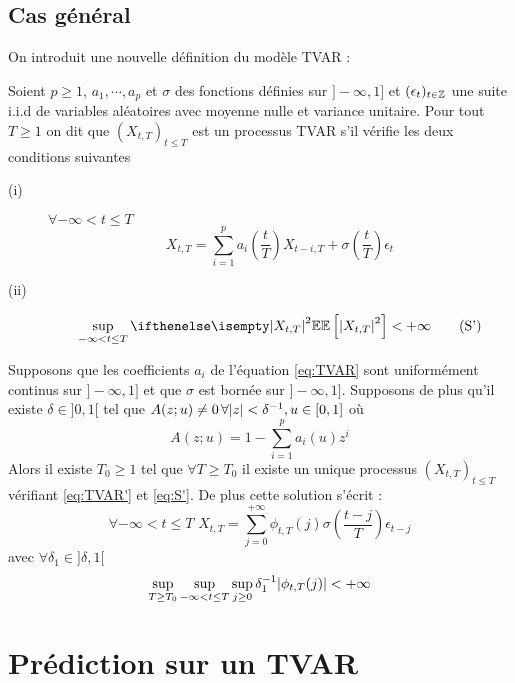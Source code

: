 \documentclass[a4paper,french]{article}
\begin{document}
\subsection{Cas général}
On introduit une nouvelle définition du modèle TVAR :
\begin{Def} \label{def:TVAR}
Soient $p\geq 1$, $a_1,\cdots, a_p$ et $\sigma$ des fonctions définies sur $]-\infty,1]$ et $(\epsilon_t)_{t\in \mathbb{Z}}$ une suite i.i.d de variables aléatoires avec moyenne nulle et variance unitaire. Pour tout $T \geq 1$ on dit que $(X_{t,T})_{t\leq T}$ est un processus TVAR s'il vérifie les deux conditions suivantes 
\begin{description}
\item[(i)] $\forall -\infty < t \leq T $
\begin{equation}\label{eq:TVAR'}
X_{t,T} = \sum_{i=1}^p a_i\left( \frac{t}{T}\right) X_{t-i,T} + \sigma\left( \frac{t}{T} \right) \epsilon_t
\tag{TVAR'}
\end{equation}
\item[(ii)]
\begin{equation}\label{eq:S'}
\sup_{-\infty < t\leq T} \EE[\abs{X_{t,T}}^2] < +\infty
\tag{S'}
\end{equation}
\end{description}
\end{Def}
\begin{Prop}\label{prop:TVAR}
Supposons que les coefficients $a_i$ de l'équation \eqref{eq:TVAR} sont uniformément continus sur $]-\infty,1]$ et que $\sigma$ est bornée sur $]-\infty,1]$. Supposons de plus qu'il existe $\delta \in ]0,1[$ tel que $A(z;u)\neq 0 \, \forall { \left| z \right|} < \delta^{-1}, u\in [0,1]$ où 
\[
A(z;u) = 1 - \sum_{i=1}^p a_i(u) z^i
\]
Alors il existe $T_0 \geq 1$ tel que $\forall T \geq T_0$ il existe un unique processus $(X_{t,T})_{t\leq T}$ vérifiant \eqref{eq:TVAR'} et \eqref{eq:S'}. De plus cette solution s'écrit : 
\begin{equation}\label{eq:repr_lineaire}
\forall -\infty < t \leq T
 \,\, X_{t,T} = \sum_{j=0}^{+\infty} \phi_{t,T} (j) \sigma\left( \frac{t-j}{T} \right) \epsilon_{t-j}
\end{equation}
avec $\forall \delta_1 \in ]\delta, 1[$
$$
\sup_{T \geq T_0} \sup_{-\infty < t \leq T} \sup_{j\geq 0} \delta_1^{-1} { \left| \phi_{t,T}(j) \right|} < +\infty
$$

\end{Prop}

\section{Prédiction sur un TVAR}
\end{document}
